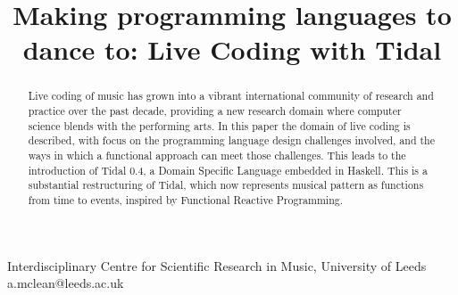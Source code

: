 \documentclass[authoryear,preprint]{sigplanconf}
\begin{document}
\setlength{\pdfpageheight}{\paperheight}
\setlength{\pdfpagewidth}{\paperwidth}







\title{Making programming languages to dance to: Live Coding with Tidal}

           {Interdisciplinary Centre for Scientific Research in Music, University of Leeds}
           {a.mclean@leeds.ac.uk}

\maketitle

\begin{abstract}

Live coding of music has grown into a vibrant international community
of research and practice over the past decade, providing a new
research domain where computer science blends with the performing
arts. In this paper the domain of live coding is described, with focus
on the programming language design challenges involved, and the ways
in which a functional approach can meet those challenges. This leads
to the introduction of Tidal 0.4, a Domain Specific Language embedded
in Haskell. This is a substantial restructuring of Tidal, which now
represents musical pattern as functions from time to events, inspired
by Functional Reactive Programming.

\end{abstract}

\end{document}
